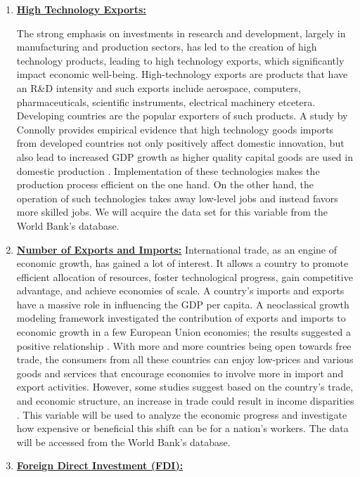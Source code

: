\begin{enumerate}
\item \underline{\textbf{High Technology Exports:}}

The strong emphasis on investments in research and development, largely in manufacturing and production sectors, has led to the creation of high technology products, leading to high technology exports, which significantly impact economic well-being. High-technology exports are products that have an R&D intensity and such exports include aerospace, computers, pharmaceuticals, scientific instruments, electrical machinery etcetera. Developing countries are the popular exporters of such products. A study by Connolly provides empirical evidence that high technology goods imports from developed countries not only positively affect domestic innovation, but also lead to increased GDP growth as higher quality capital goods are used in domestic production \cite{gani2009technological}. Implementation of these technologies makes the production process efficient on the one hand. On the other hand, the operation of such technologies takes away low-level jobs and instead favors more skilled jobs. We will acquire the data set for this variable from the World Bank's database.

\item \underline{\textbf{Number of Exports and Imports:}}
International trade, as an engine of economic growth, has gained a lot of interest. It allows a country to promote efficient allocation of resources, foster technological progress, gain competitive advantage, and achieve economies of scale. A country's imports and exports have a massive role in influencing the GDP per capita. A neoclassical growth modeling framework investigated the contribution of exports and imports to economic growth in a few European Union economies; the results suggested a positive relationship \cite{awokuse2007causality}. With more and more countries being open towards free trade, the consumers from all these countries can enjoy low-prices and various goods and services that encourage economies to involve more in import and export activities. However, some studies suggest based on the country’s trade, and economic structure, an increase in trade could result in income disparities \cite{rosenfeld2019international}. This variable will be used to analyze the economic progress and investigate how expensive or beneficial this shift can be for a nation’s workers. The data will be accessed from the World Bank's database.

\item \underline{\textbf{Foreign Direct Investment (FDI):}}


\end{enumerate}
